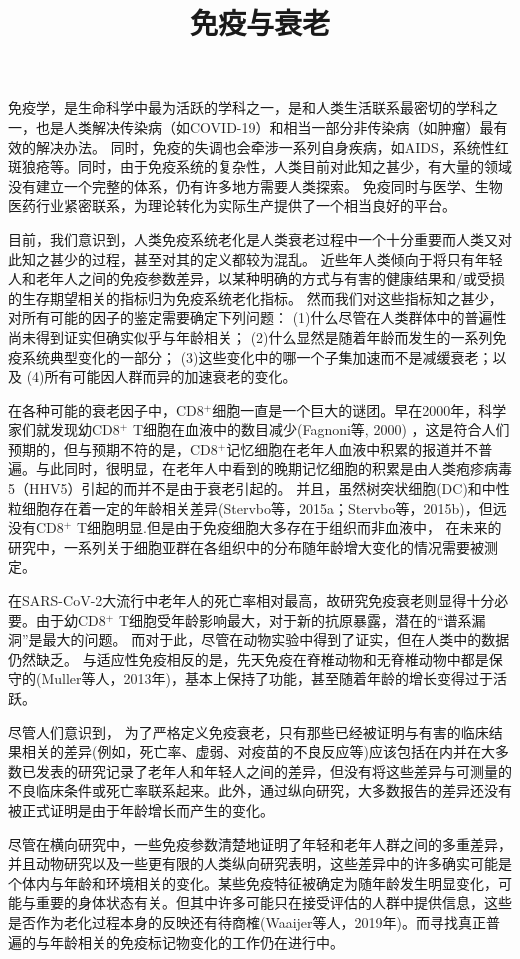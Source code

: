 \documentclass[utf8,10.5pt]{ctexart}
\author{}
\date{}
\title{免疫与衰老}
\begin{document}
    \maketitle
    免疫学，是生命科学中最为活跃的学科之一，是和人类生活联系最密切的学科之一，也是人类解决传染病（如COVID-19）和相当一部分非传染病（如肿瘤）最有效的解决办法。
    同时，免疫的失调也会牵涉一系列自身疾病，如AIDS，系统性红斑狼疮等。同时，由于免疫系统的复杂性，人类目前对此知之甚少，有大量的领域没有建立一个完整的体系，仍有许多地方需要人类探索。
    免疫同时与医学、生物医药行业紧密联系，为理论转化为实际生产提供了一个相当良好的平台。

    目前，我们意识到，人类免疫系统老化是人类衰老过程中一个十分重要而人类又对此知之甚少的过程，甚至对其的定义都较为混乱。
    近些年人类倾向于将只有年轻人和老年人之间的免疫参数差异，以某种明确的方式与有害的健康结果和/或受损的生存期望相关的指标归为免疫系统老化指标。
    然而我们对这些指标知之甚少，对所有可能的因子的鉴定需要确定下列问题：
    (1)什么尽管在人类群体中的普遍性尚未得到证实但确实似乎与年龄相关；
    (2)什么显然是随着年龄而发生的一系列免疫系统典型变化的一部分；
    (3)这些变化中的哪一个子集加速而不是减缓衰老；以及
    (4)所有可能因人群而异的加速衰老的变化。

    在各种可能的衰老因子中，CD8$^+$细胞一直是一个巨大的谜团。早在2000年，科学家们就发现幼CD8$^+$ T细胞在血液中的数目减少(Fagnoni等, 2000)
    ，这是符合人们预期的，但与预期不符的是，CD8$^+$记忆细胞在老年人血液中积累的报道并不普遍。与此同时，很明显，在老年人中看到的晚期记忆细胞的积累是由人类疱疹病毒5（HHV5）引起的而并不是由于衰老引起的。
    并且，虽然树突状细胞(DC)和中性粒细胞存在着一定的年龄相关差异(Stervbo等，2015a；Stervbo等，2015b)，但远没有CD8$^+$ T细胞明显.但是由于免疫细胞大多存在于组织而非血液中，
    在未来的研究中，一系列关于细胞亚群在各组织中的分布随年龄增大变化的情况需要被测定。

    在SARS-CoV-2大流行中老年人的死亡率相对最高，故研究免疫衰老则显得十分必要。由于幼CD8$^+$ T细胞受年龄影响最大，对于新的抗原暴露，潜在的“谱系漏洞”是最大的问题。
    而对于此，尽管在动物实验中得到了证实，但在人类中的数据仍然缺乏。
    与适应性免疫相反的是，先天免疫在脊椎动物和无脊椎动物中都是保守的(Muller等人，2013年)，基本上保持了功能，甚至随着年龄的增长变得过于活跃。
    
    尽管人们意识到， 为了严格定义免疫衰老，只有那些已经被证明与有害的临床结果相关的差异(例如，死亡率、虚弱、对疫苗的不良反应等)应该包括在内并在大多数已发表的研究记录了老年人和年轻人之间的差异，但没有将这些差异与可测量的不良临床条件或死亡率联系起来。此外，通过纵向研究，大多数报告的差异还没有被正式证明是由于年龄增长而产生的变化。

    尽管在横向研究中，一些免疫参数清楚地证明了年轻和老年人群之间的多重差异，并且动物研究以及一些更有限的人类纵向研究表明，这些差异中的许多确实可能是个体内与年龄和环境相关的变化。某些免疫特征被确定为随年龄发生明显变化，可能与重要的身体状态有关。但其中许多可能只在接受评估的人群中提供信息，这些是否作为老化过程本身的反映还有待商榷(Waaijer等人，2019年)。而寻找真正普遍的与年龄相关的免疫标记物变化的工作仍在进行中。
    
\end{document}
